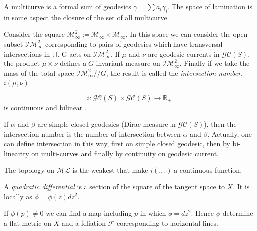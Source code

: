 \begin{rmq}
A multicurve is a formal sum of geodesics $\gamma = \sum a_i \gamma_i$. The space of lamination is in some aspect the closure of the set of all multicurve
\end{rmq}

\begin{dfnt}
Consider the square $\mathcal{M}_\infty^2 := \mathcal{M}_\infty \times \mathcal{M}_\infty $. In this space we can consider the open subset $\mathcal{IM}^2_\infty$ corresponding to pairs of geodesics which have transversal intersections in $\mathbb{H}$. G acts on $\mathcal{IM}^2_\infty$.
If $\mu$ and $\nu$ are geodesic currents in $\mathcal{GC}(S)$, the product $\mu \times \nu$ defines a $G$-invariant measure on $\mathcal{IM}^2_\infty$.
Finally if we take the mass of the total space $\mathcal{IM}^2_\infty // G$, the result is called the \emph{intersection number}, $i(\mu,\nu)$
\end{dfnt}

\begin{prop}
\[
i: \mathcal{GC}(S) \times \mathcal{GC}(S) \to \mathbb{R}_+
\]
is continuous and bilinear \cite{Bonahon1988}.
\end{prop}

\begin{rmq}
If $\alpha$ and $\beta$ are simple closed geodesics (Dirac measure in $\mathcal{GC}(S)$), then the intersection number is the number of intersection between $\alpha$ and $\beta$.
Actually, one can define intersection in this way, first on simple closed geodesic, then by bi-linearity on multi-curves and finally by continuity on geodesic current.
\end{rmq}

\begin{rmq}
The topology on $\mathcal{ML}$ is the weakest that make $i(.,.)$ a continuous function.
\end{rmq}

\begin{dfnt}
A \emph{quadratic differential} is a section of the square of the tangent space to $X$. It is locally as $\phi= \phi(z) dz^2$.
\end{dfnt}

\begin{rmq}
If $\phi(p) \neq 0$ we can find a map including $p$ in which $\phi = dz^2$.
Hence $\phi$ determine a flat metric on $X$ and a foliation $\mathcal{F}$ corresponding to horizontal lines.
\end{rmq}


